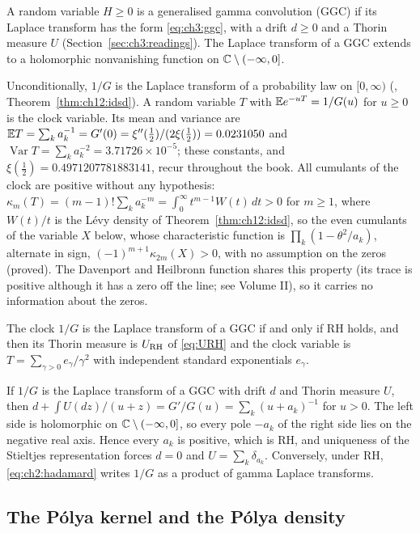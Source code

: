 A random variable $H\ge0$ is a generalised gamma convolution (GGC) if its Laplace transform has the form \eqref{eq:ch3:ggc}, with a drift $d\ge0$ and a Thorin measure $U$ (Section~\ref{sec:ch3:readings}). The Laplace transform of a GGC extends to a holomorphic nonvanishing function on $\mathbb{C}\setminus(-\infty,0]$.

Unconditionally, $1/G$ is the Laplace transform of a probability law on $[0,\infty)$ (\cite[Theorem A]{P26}, Theorem~\ref{thm:ch12:idsd}). A random variable $T$ with $\mathbb{E} e^{-uT}=1/G(u)$ for $u\ge0$ is the clock variable. Its mean and variance are $\mathbb{E} T=\sum_ka_k^{-1}=G'(0)=\xi''(\frac12)/(2\xi(\frac12))=0.0231050$ and $\operatorname{Var}T=\sum_ka_k^{-2}=3.71726\times10^{-5}$; these constants, and $\xi(\frac12)=0.4971207781883141$, recur throughout the book. All cumulants of the clock are positive without any hypothesis: $\kappa_m(T)=(m-1)!\sum_ka_k^{-m}=\int_0^\infty t^{m-1}W(t)\,dt>0$ for $m\ge1$, where $W(t)/t$ is the L\'evy density of Theorem~\ref{thm:ch12:idsd}, so the even cumulants of the variable $X$ below, whose characteristic function is $\prod_k(1-\theta^2/a_k)$, alternate in sign, $(-1)^{m+1}\kappa_{2m}(X)>0$, with no assumption on the zeros (proved). The Davenport and Heilbronn function shares this property (its trace is positive although it has a zero off the line; see Volume II), so it carries no information about the zeros.

\begin{proposition}\label{prop:rigid}
The clock $1/G$ is the Laplace transform of a GGC if and only if RH holds, and then its Thorin measure is $U_{\mathrm{RH}}$ of \eqref{eq:URH} and the clock variable is $T=\sum_{\gamma>0}e_\gamma/\gamma^2$ with independent standard exponentials $e_\gamma$.
\end{proposition}

If $1/G$ is the Laplace transform of a GGC with drift $d$ and Thorin measure $U$, then $d+\int U(dz)/(u+z)=G'/G(u)=\sum_k(u+a_k)^{-1}$ for $u>0$. The left side is holomorphic on $\mathbb{C}\setminus(-\infty,0]$, so every pole $-a_k$ of the right side lies on the negative real axis. Hence every $a_k$ is positive, which is RH, and uniqueness of the Stieltjes representation forces $d=0$ and $U=\sum_k\delta_{a_k}$. Conversely, under RH, \eqref{eq:ch2:hadamard} writes $1/G$ as a product of gamma Laplace transforms.

\subsection{The P\'olya kernel and the P\'olya density}

